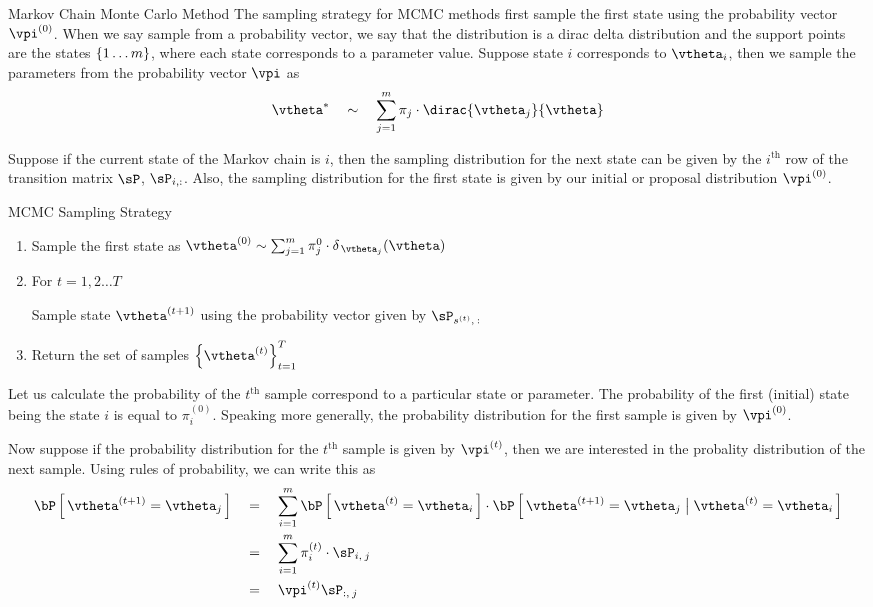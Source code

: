 \documentclass[11pt,a4paper]{article}
\begin{document}
\begin{ssection}{Markov Chain Monte Carlo Method}
	The sampling strategy for MCMC methods first sample the first state using the probability vector $\vpi^{(0)}$. When we say sample from a probability vector, we say that the distribution is a dirac delta distribution and the support points are the states $\left\{ {1 \dots m} \right\}$, where each state corresponds to a parameter value. Suppose state $i$ corresponds to $\vtheta_i$, then we sample the parameters from the probability vector $\vpi$ as
	\begin{align*}
		\vtheta^{\ast} \qsim \sum_{j = 1}^m \pi_j \cdot \dirac{\vtheta_j}{\vtheta}
	\end{align*}

	Suppose if the current state of the Markov chain is $i$, then the sampling distribution for the next state can be given by the $i^{\text{th}}$ row of the transition matrix $\sP$, \ie $\sP_{i, :}$. Also, the sampling distribution for the first state is given by our initial or proposal distribution $\vpi^{(0)}$.

	\begin{algo}[0.9\textwidth]{MCMC Sampling Strategy}

		\begin{enumerate}
			\item Sample the first state as $\vtheta^{(0)} \sim \sum_{j = 1}^m \pi_j^0 \cdot \delta_{\,\vtheta_j}(\vtheta)$
			\item For $t = 1, 2 \dots T$

				\begin{addmargin}{1em}
					Sample state $\vtheta^{(t + 1)}$ using the probability vector given by $\sP_{s^{(t)},\::}$
				\end{addmargin}
			\item Return the set of samples $\set{\vtheta^{(t)}}_{t = 1}^T$
		\end{enumerate}

	\end{algo}

	Let us calculate the probability of the $t^{\text{th}}$ sample correspond to a particular state or parameter. The probability of the first (initial) state being the state $i$ is equal to $\pi^{(0)}_i$. Speaking more generally, the probability distribution for the first sample is given by $\vpi^{(0)}$.

	Now suppose if the probability distribution for the $t^{\text{th}}$ sample is given by $\vpi^{(t)}$, then we are interested in the probality distribution of the next sample. Using rules of probability, we can write this as
	\begin{align*}
		\prob{\vtheta^{(t + 1)} = \vtheta_j} &\eq \sum_{i = 1}^m \prob{\vtheta^{(t)} = \vtheta_i} \cdot \prob{\vtheta^{(t + 1)} = \vtheta_j \pipe \vtheta^{(t)} = \vtheta_i} \\
		&\eq \sum_{i = 1}^m \pi_i^{(t)} \cdot \sP_{i,\:j} \\
		&\eq \vpi^{(t)} \sP_{:,\:j}
	\end{align*}


\end{ssection}
\end{document}
